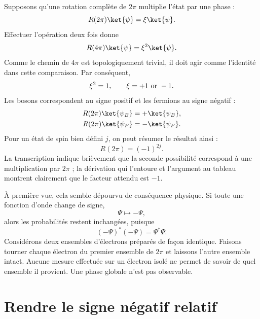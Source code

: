 Supposons qu’une rotation complète de \(2\pi\) multiplie l’état par une phase :
\begin{equation}
R(2\pi)\ket{\psi}=\xi\ket{\psi}.
\end{equation}
Effectuer l’opération deux fois donne
\begin{equation}
R(4\pi)\ket{\psi}=\xi^2\ket{\psi}.
\end{equation}
Comme le chemin de \(4\pi\) est topologiquement trivial, il doit agir comme l’identité dans cette comparaison. Par conséquent,
\begin{equation}
\xi^2=1,
\qquad
\xi=+1\ \hbox{or}\ -1.
\end{equation}
Les bosons correspondent au signe positif et les fermions au signe négatif :
\begin{align}
R(2\pi)\ket{\psi_B}&=+\ket{\psi_B},\\
R(2\pi)\ket{\psi_F}&=-\ket{\psi_F}.
\end{align}
Pour un état de spin bien défini \(j\), on peut résumer le résultat ainsi :
\begin{equation}
R(2\pi)=(-1)^{2j}.
\end{equation}
La transcription indique brièvement que la seconde possibilité correspond à une multiplication par \(2\pi\) ; la dérivation qui l’entoure et l’argument au tableau montrent clairement que le facteur attendu est \(-1\).

À première vue, cela semble dépourvu de conséquence physique. Si toute une fonction d’onde change de signe,
\begin{equation}
\Psi\longmapsto-\Psi,
\end{equation}
alors les probabilités restent inchangées, puisque
\begin{equation}
(-\Psi)^*(-\Psi)=\Psi^*\Psi.
\end{equation}
Considérons deux ensembles d’électrons préparés de façon identique. Faisons tourner chaque électron du premier ensemble de \(2\pi\) et laissons l’autre ensemble intact. Aucune mesure effectuée sur un électron isolé ne permet de savoir de quel ensemble il provient. Une phase globale n’est pas observable.

\section{Rendre le signe négatif relatif}


